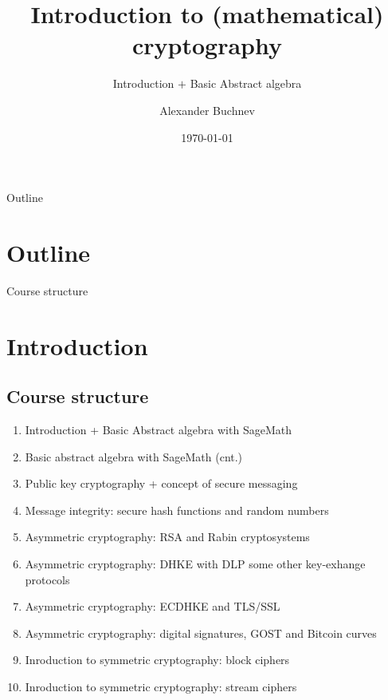 \documentclass{beamer}
\title{Introduction to (mathematical) cryptography}
\subtitle{Introduction $+$ Basic Abstract algebra}
\author{Alexander Buchnev}
\date{\monthYear\today}
\begin{document}
\frame{
	\titlepage
}

\begin{frame}{Outline}
    \section{Outline}
	\tableofcontents[hideallsubsections]
\end{frame}

\begin{frame}{Course structure}
    \section{Introduction}
    \subsection{Course structure}
    \begin{enumerate}
        \item Introduction + Basic Abstract algebra with SageMath
        \item Basic abstract algebra with SageMath (cnt.)
        \item Public key cryptography + concept of secure messaging %
        \item Message integrity: secure hash functions and random numbers
        \item Asymmetric cryptography: RSA and Rabin cryptosystems
        \item Asymmetric cryptography: DHKE with DLP some other key-exhange protocols 
        \item Asymmetric cryptography: ECDHKE and TLS/SSL
        \item Asymmetric cryptography: digital signatures, GOST and Bitcoin curves
        \item Inroduction to symmetric cryptography: block ciphers
        \item Inroduction to symmetric cryptography: stream ciphers
    \end{enumerate}
\end{frame}
\end{document}
